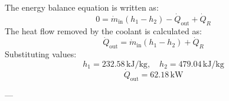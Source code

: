 The energy balance equation is written as:  
\[
0 = \dot{m}_{\text{in}} \left( h_1 - h_2 \right) - \dot{Q}_{\text{out}} + \dot{Q}_R
\]  
The heat flow removed by the coolant is calculated as:  
\[
\dot{Q}_{\text{out}} = \dot{m}_{\text{in}} \left( h_1 - h_2 \right) + \dot{Q}_R
\]  
Substituting values:  
\[
h_1 = 232.58 \, \text{kJ/kg}, \quad h_2 = 479.04 \, \text{kJ/kg}
\]  
\[
\dot{Q}_{\text{out}} = 62.18 \, \text{kW}
\]  

---